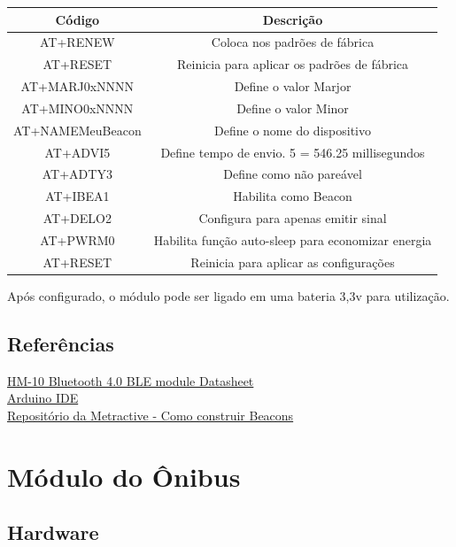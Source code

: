 \documentclass[
	12pt,				%
	oneside,			%
	a4paper,			%
	brazil				%
]{abntex2}
\begin{document}
{\begin{tabular}{|c|c|}
\hline 
Código & Descrição \\ 
\hline 
AT+RENEW & Coloca nos padrões de fábrica \\ 
\hline 
AT+RESET & Reinicia para aplicar os padrões de fábrica \\ 
\hline 
AT+MARJ0xNNNN & Define o valor Marjor \\ 
\hline 
AT+MINO0xNNNN & Define o valor Minor \\ 
\hline 
AT+NAMEMeuBeacon & Define o nome do dispositivo \\ 
\hline 
AT+ADVI5 & Define tempo de envio. 5 = 546.25 millisegundos \\ 
\hline 
AT+ADTY3 & Define como não pareável \\ 
\hline 
AT+IBEA1 & Habilita como Beacon \\ 
\hline 
AT+DELO2 & Configura para apenas emitir sinal \\ 
\hline 
AT+PWRM0 & Habilita função auto-sleep para economizar energia \\ 
\hline 
AT+RESET & Reinicia para aplicar as configurações \\ 
\hline 
\end{tabular} 

Após configurado, o módulo pode ser ligado em uma bateria 3,3v para utilização.

\subsection{Referências}

\href{ftp://imall.iteadstudio.com/Modules/IM130614001_Serial_Port_BLE_Module_Master_Slave_HM-10/DS_IM130614001_Serial_Port_BLE_Module_Master_Slave_HM-10.pdf}{HM-10 Bluetooth 4.0 BLE module Datasheet}
\\
\href{https://www.arduino.cc/en/main/software}{Arduino IDE}
\\
\href{https://github.com/metractive/beacon-study}{Repositório da Metractive - Como construir Beacons}

\section{Módulo do Ônibus}

\subsection{Hardware}

}
\end{document}
